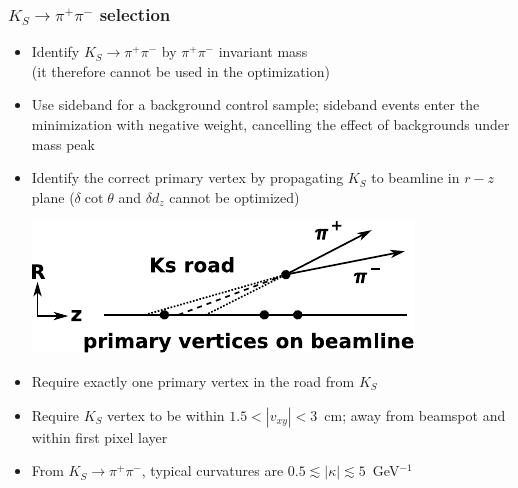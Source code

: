\documentclass[compress]{beamer}
\begin{document}
\begin{frame}
\frametitle{$K_S \to \pi^+\pi^-$ selection}
\begin{itemize}\setlength{\itemsep}{0.25 cm}
\item Identify $K_S \to \pi^+\pi^-$ by $\pi^+\pi^-$ invariant mass \\ (it therefore cannot be used in the optimization)

\item Use sideband for a background control sample; sideband events
  enter the minimization with negative weight, cancelling the effect
  of backgrounds under mass peak

\item Identify the correct primary vertex by propagating $K_S$ to beamline in $r-z$ plane ($\delta \cot\theta$ and $\delta d_z$ cannot be optimized)

\begin{center}
\includegraphics[width=0.4\linewidth]{diagram2.pdf}
\end{center}

\item Require exactly one primary vertex in the road from $K_S$

\item Require $K_S$ vertex to be within $1.5 < |v_{xy}| < 3$~cm; away
  from beamspot and within first pixel layer

\item From $K_S \to \pi^+\pi^-$, typical curvatures are $0.5 \lesssim |\kappa| \lesssim 5$~GeV$^{-1}$
\end{itemize}
\end{frame}

\end{document}
